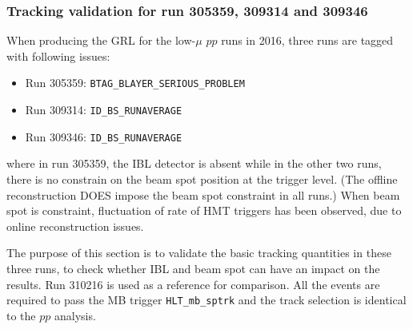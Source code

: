 \subsubsection{Tracking validation for run 305359, 309314 and 309346}
When producing the GRL for the low-$\mu$ $pp$ runs in 2016, three runs are tagged with following issues:
\begin{itemize}
\item Run 305359: \verb|BTAG_BLAYER_SERIOUS_PROBLEM|
\item Run 309314: \verb|ID_BS_RUNAVERAGE|
\item Run 309346: \verb|ID_BS_RUNAVERAGE|
\end{itemize}
where in run 305359, the IBL detector is absent while in the other two runs, there is no constrain on the beam spot position at the trigger level. (The offline reconstruction DOES impose the beam spot constraint in all runs.) When beam spot is constraint, fluctuation of rate of HMT triggers has been observed, due to online reconstruction issues.

The purpose of this section is to validate the basic tracking quantities in these three runs, to check whether IBL and beam spot can have an impact on the results. Run 310216 is used as a reference for comparison. All the events are required to pass the MB trigger \verb|HLT_mb_sptrk| and the track selection is identical to the $pp$ analysis.


